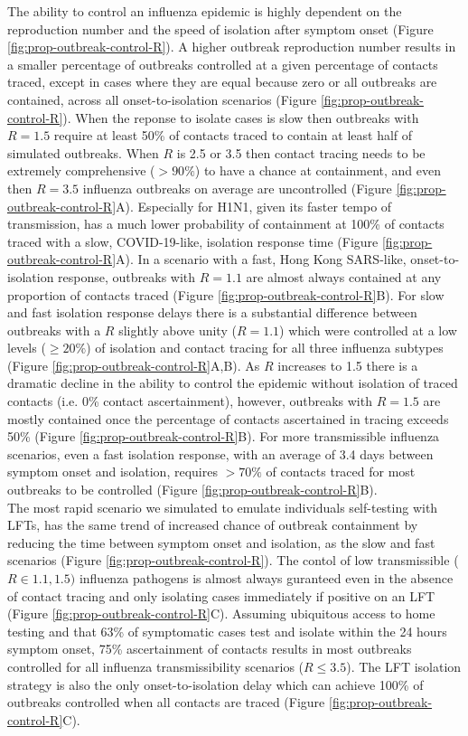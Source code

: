 \documentclass{article}
\begin{document}
The ability to control an influenza epidemic is highly dependent on the reproduction number and the speed of isolation after symptom onset (Figure \ref{fig:prop-outbreak-control-R}). A higher outbreak reproduction number results in a smaller percentage of outbreaks controlled at a given percentage of contacts traced, except in cases where they are equal because zero or all outbreaks are contained, across all onset-to-isolation scenarios (Figure \ref{fig:prop-outbreak-control-R}). When the reponse to isolate cases is slow then outbreaks with $R = 1.5$ require at least 50\% of contacts traced to contain at least half of simulated outbreaks. When $R$ is 2.5 or 3.5 then contact tracing needs to be extremely comprehensive ($>90\%$) to have a chance at containment, and even then $R = 3.5$ influenza outbreaks on average are uncontrolled (Figure \ref{fig:prop-outbreak-control-R}A). Especially for H1N1, given its faster tempo of transmission, has a much lower probability of containment at 100\% of contacts traced with a slow, COVID-19-like, isolation response time (Figure \ref{fig:prop-outbreak-control-R}A). In a scenario with a fast, Hong Kong SARS-like, onset-to-isolation response, outbreaks with $R = 1.1$ are almost always contained at any proportion of contacts traced (Figure \ref{fig:prop-outbreak-control-R}B). For slow and fast isolation response delays there is a substantial difference between outbreaks with a $R$ slightly above unity ($R = 1.1$) which were controlled at a low levels ($\geq 20\%$) of isolation and contact tracing for all three influenza subtypes (Figure \ref{fig:prop-outbreak-control-R}A,B). As $R$ increases to 1.5 there is a dramatic decline in the ability to control the epidemic without isolation of traced contacts (i.e. 0\% contact ascertainment), however, outbreaks with $R = 1.5$ are mostly contained once the percentage of contacts ascertained in tracing exceeds 50\% (Figure \ref{fig:prop-outbreak-control-R}B). For more transmissible influenza scenarios, even a fast isolation response, with an average of 3.4 days between symptom onset and isolation, requires $>70\%$ of contacts traced for most outbreaks to be controlled (Figure \ref{fig:prop-outbreak-control-R}B). \\

The most rapid scenario we simulated to emulate individuals self-testing with LFTs, has the same trend of increased chance of outbreak containment by reducing the time between symptom onset and isolation, as the slow and fast scenarios (Figure \ref{fig:prop-outbreak-control-R}). The contol of low transmissible ($R \in {1.1, 1.5})$ influenza pathogens is almost always guranteed even in the absence of contact tracing and only isolating cases immediately if positive on an LFT (Figure \ref{fig:prop-outbreak-control-R}C). Assuming ubiquitous access to home testing and that 63\% of symptomatic cases test and isolate within the 24 hours symptom onset, 75\% ascertainment of contacts results in most outbreaks controlled for all influenza transmissibility scenarios ($R \leq 3.5$). The LFT isolation strategy is also the only onset-to-isolation delay which can achieve 100\% of outbreaks controlled when all contacts are traced (Figure \ref{fig:prop-outbreak-control-R}C). \\
\end{document}
